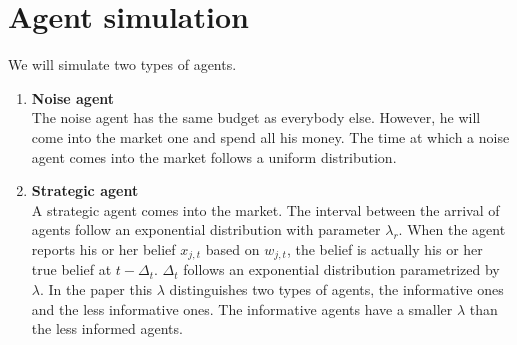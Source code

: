 \documentclass{article}
\begin{document}
\section{Agent simulation}
We will simulate two types of agents.
\begin{enumerate}
    \item \textbf{Noise agent}\\
    The noise agent has the same budget as everybody else. However, he will come into the market one and spend all his money. The time at which a noise agent comes into the market follows a uniform distribution.
    \item \textbf{Strategic  agent}\\
    A strategic agent comes into the market. The interval between the arrival of agents follow an exponential distribution with parameter $\lambda_r$. When the agent reports his or her belief $x_{j,t}$ based on $w_{j,t}$, the belief is actually his or her true belief at $t-\Delta_t$. $\Delta_t$ follows an exponential distribution parametrized by $\lambda$. In the paper this $\lambda$ distinguishes two types of agents, the informative ones and the less informative ones. The informative agents have a smaller $\lambda$ than the less informed agents.
    
\end{enumerate}
\end{document}
